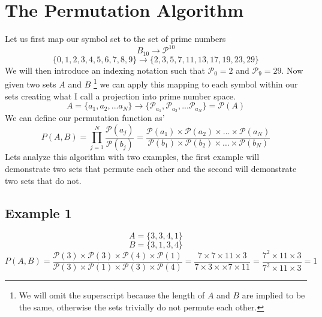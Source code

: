 \documentclass[]{article}
\begin{document}
\section*{The Permutation Algorithm}
Let us first map our symbol set to the set of prime numbers
\begin{equation}
B_{10} \longrightarrow \mathcal{P}^{10}
\end{equation}
\begin{equation}
\{0, 1, 2, 3, 4, 5, 6, 7, 8, 9\} \longrightarrow \{2, 3, 5, 7, 11, 13, 17, 19, 23, 29\}
\end{equation}
We will then introduce an indexing notation such that $\mathcal{P}_{0}=2$ and $\mathcal{P}_{9}=29$. Now given two sets $A$ and $B$ \footnote{We will omit the superscript because the length of $A$ and $B$ are implied to be the same, otherwise the sets trivially do not permute each other.} we can apply this mapping to each symbol within our sets creating what I call a projection into prime number space.
\begin{equation}
A = \{a_{1}, a_{2}, ... a_{N}\}  \longrightarrow \{\mathcal{P}_{a_{1}}, \mathcal{P}_{a_{2}}, ... \mathcal{P}_{a_{N}} \} = \mathcal{P}(A)
\end{equation}
We can define our permutation function as'
\begin{equation}
P(A, B) = \prod_{j=1}^{N} \frac{\mathcal{P}(a_{j})}{\mathcal{P}(b_{j})} = \frac{\mathcal{P}(a_{1}) \times \mathcal{P}(a_{2}) \times \dots \times \mathcal{P}(a_{N})}{\mathcal{P}(b_{1}) \times \mathcal{P}(b_{2}) \times \dots \times \mathcal{P}(b_{N})}
\end{equation}
Lets analyze this algorithm with two examples, the first example will demonstrate two sets that permute each other and the second will demonstrate two sets that do not.
\subsection*{Example 1}
\begin{equation}
	A = \{3, 3, 4, 1\}
\end{equation}
\begin{equation}
	B = \{3, 1, 3, 4\}
\end{equation}
\begin{equation}
P(A, B) = \frac{\mathcal{P}(3) \times \mathcal{P}(3) \times \mathcal{P}(4) \times \mathcal{P}(1)}{\mathcal{P}(3) \times \mathcal{P}(1) \times \mathcal{P}(3) \times \mathcal{P}(4)} = \frac{7 \times 7 \times 11 \times 3}{7 \times 3 \times \times 7 \times 11} = \frac{7^{2} \times 11 \times 3}{7^{2} \times 11 \times 3} = 1
\end{equation}
\end{document}
